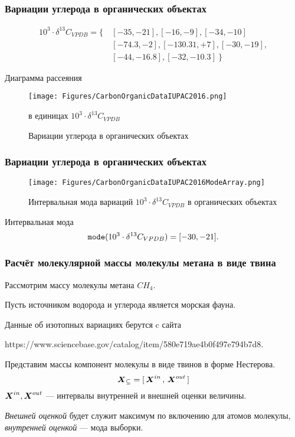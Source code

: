 \begin{frame}
	\frametitle{Вариации углерода в органических объектах}
	
\begin{align}
	10^3 \cdot \delta ^{13}C_{VPDB} = \{ \
	&	[-35, -21 ], [ -16, -9 ], [ -34, -10 ] \nonumber \\
	&	[ -74.3, -2 ], [ -130.31, +7 ], [ -30, -19], \nonumber \\
	& 	[ -44, -16.8], [ -32, -10.3] \	\}
\end{align}

Диаграмма рассеяния 
\begin{figure}[ht] 
	\centering\small
	\unitlength=1mm
	{\texttt{[image: Figures/CarbonOrganicDataIUPAC2016.png]}} 
	\caption{Вариации углерода в органических объектах} в единицах $10^3 \cdot \delta ^{13}C_{VPDB}$
	\label{f:OrganicCarbonVariation}
\end{figure}

	
\end{frame}

\begin{frame}
	\frametitle{Вариации углерода в органических объектах}
	
\begin{figure}[ht] 
	\begin{center}
		\unitlength=1mm
		{\texttt{[image: Figures/CarbonOrganicDataIUPAC2016ModeArray.png]}} 
		\caption{Интервальная мода 
			вариаций $10^3 \cdot \delta ^{13}C_{VPDB}$ в органических объектах} 
		\label{f:OrganicCarbonVariationMode}
	\end{center}	
\end{figure}

Интервальная мода
\begin{equation}
	{\tt mode}( 10^3 \cdot \delta ^{13}C_{VPDB} ) = [-30, -21].
\end{equation}	

\end{frame}

\begin{frame}
	\frametitle{Расчёт молекулярной массы молекулы метана в виде твина}

Рассмотрим  массу молекулы метана $CH_4$.

Пусть источником водорода и углерода является   морская фауна. 

Данные об изотопных вариациях берутся c сайта 

\medskip
https://www.sciencebase.gov/catalog/item/580e719ae4b0f497e794b7d8.

\medskip
Представим массы компонент молекулы в виде твинов в форме Нестерова.
\begin{equation*}
	\protect\text{\boldmath$X$}_{\subseteq} = [ \, \protect\text{\boldmath$X$}^{in} \, ,  \, \protect\text{\boldmath$X$}^{out} \, ]
\end{equation*}
$\protect\text{\boldmath$X$}^{in}, \protect\text{\boldmath$X$}^{out}$ --- интервалы внутренней и внешней оценки величины.

\medskip
\emph{Внешней оценкой} будет служит максимум по включению для атомов молекулы, \\
\emph{внутренней оценкой} --- мода выборки.

\end{frame}

